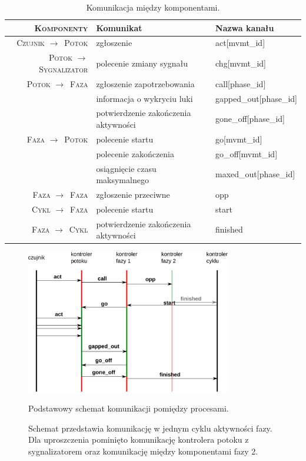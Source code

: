 \documentclass{pracamgr}
\newcommand{\rarr}{$\rightarrow$}
\theoremstyle{plain}
\begin{document}
\renewcommand{\arraystretch}{1.4}
\begin{table}
  \centering
  \begin{tabular}{>{\scshape}r|p{}|>{\ttfamily}p{}}
    \firsthline\firsthline
    \textbf{Komponenty} & \textbf{Komunikat} & \textnormal{\bfseries Nazwa kanału} \\ \hline
    Czujnik \rarr\ Potok & zgłoszenie & act[mvmt\_id] \\ \hline
    Potok \rarr\ Sygnalizator & polecenie zmiany sygnału & chg[mvmt\_id]
    \\ \hline
    Potok \rarr\ Faza & zgłoszenie zapotrzebowania & call[phase\_id] \\
                      & informacja o wykryciu luki & gapped\_out[phase\_id] \\
                      & potwierdzenie zakończenia aktywności & gone\_off[phase\_id]
    \\ \hline
    Faza \rarr\ Potok & polecenie startu & go[mvmt\_id] \\
                      & polecenie zakończenia & go\_off[mvmt\_id] \\
                      & osiągnięcie czasu maksymalnego & maxed\_out[phase\_id]
    \\ \hline
    Faza \rarr\ Faza & zgłoszenie przeciwne & opp
    \\ \hline
    Cykl \rarr\ Faza & polecenie startu & start \\ \hline
    Faza \rarr\ Cykl & potwierdzenie zakończenia aktywności & finished \\
    \hline\hline
  \end{tabular}
  \caption{Komunikacja między komponentami.}
  \label{tab:models:channels}
\end{table}

\begin{figure}
  \centering
  \includegraphics[width=0.8\textwidth]{img/models-msc}
  \caption{Podstawowy schemat komunikacji pomiędzy procesami.}
  \caption*{Schemat przedstawia komunikację w jednym cyklu aktywności
    fazy. Dla uproszczenia pominięto komunikację kontrolera potoku z
    sygnalizatorem oraz komunikację między komponentami fazy 2.}
  \label{img:models:msc}
\end{figure}
\end{document}
